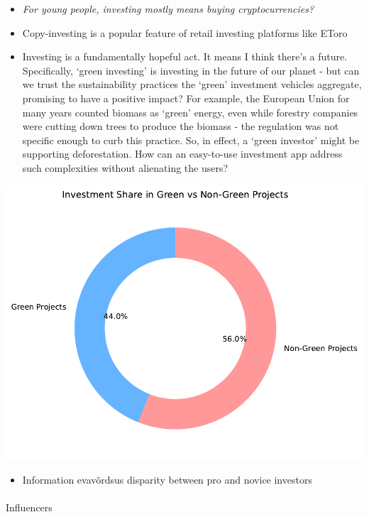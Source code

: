 \documentclass[
  letterpaper,
  DIV=11,
  numbers=noendperiod]{scrartcl}
\makeatletter
\let\oldparagraph\paragraph
\renewcommand{\paragraph}{
    \@ifstar
      \xxxParagraphStar
      \xxxParagraphNoStar
  }
\newcommand{\xxxParagraphStar}[1]{\oldparagraph*{#1}\mbox{}}
\newcommand{\xxxParagraphNoStar}[1]{\oldparagraph{#1}\mbox{}}
\providecommand{\tightlist}{%
  \setlength{\itemsep}{0pt}\setlength{\parskip}{0pt}}\usepackage{longtable,booktabs,array}
\makeatother
\begin{document}
\begin{itemize}
\item
  \emph{For young people, investing mostly means buying
  cryptocurrencies?}
\item
  Copy-investing is a popular feature of retail investing platforms like
  EToro
\item
  Investing is a fundamentally hopeful act. It means I think there's a
  future. Specifically, `green investing' is investing in the future of
  our planet - but can we trust the sustainability practices the `green'
  investment vehicles aggregate, promising to have a positive impact?
  For example, the European Union for many years counted biomass as
  `green' energy, even while forestry companies were cutting down trees
  to produce the biomass - the regulation was not specific enough to
  curb this practice. So, in effect, a `green investor' might be
  supporting deforestation. How can an easy-to-use investment app
  address such complexities without alienating the users?
\end{itemize}

\includegraphics{_thesis_files/figure-pdf/cell-41-output-1.pdf}

\begin{itemize}
\tightlist
\item
  Information evavõrdsus disparity between pro and novice investors
\end{itemize}

\paragraph{Influencers}\label{influencers}
\end{document}
